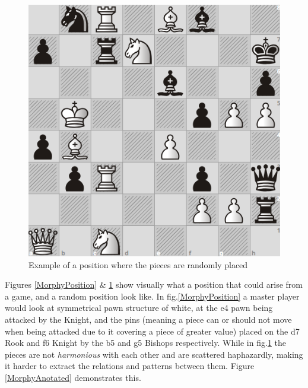 \begin{figure}[H]
    \centering
    \includegraphics[scale=0.45]{images/RandomPosition.png}
    \caption{Example of a position where the pieces are randomly placed}
    \label{RandomPosition}
\end{figure}

Figures \ref{MorphyPosition} \& \ref{RandomPosition} show visually what a position that could arise from a game, and a random position look like. In fig.\ref{MorphyPosition} a master player would look at symmetrical pawn structure of white, at the e4 pawn being attacked by the Knight, and the pins (meaning a piece can or should not move when being attacked due to it covering a piece of greater value) placed on the d7 Rook and f6 Knight by the b5 and g5 Bishops respectively. While in fig.\ref{RandomPosition} the pieces are not \textit{harmonious} with each other and are scattered haphazardly, making it harder to extract the relations and patterns between them. Figure \ref{MorphyAnotated} demonstrates this.

